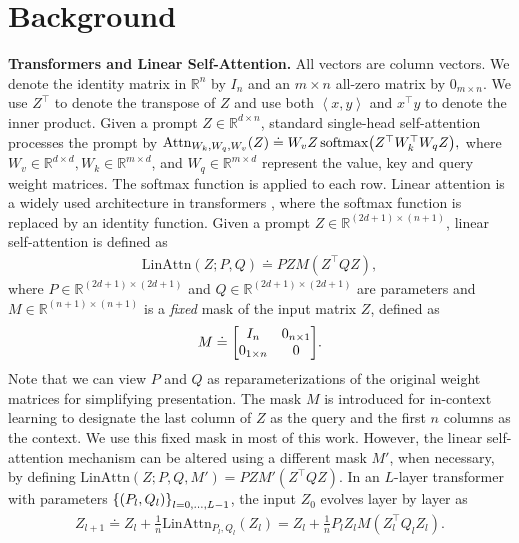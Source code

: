 \documentclass{article}
\newcommand{\R}{\mathbb{R}}
\newcommand{\indot}[2]{{\left<#1, #2\right>}}
\newcommand{\attn}{\text{LinAttn}}
\newcommand{\softmax}[1]{\text{softmax}\qty(#1)}
\begin{document}
\section{Background}
\label{sec bkg}
\textbf{Transformers and Linear Self-Attention.}
All vectors are column vectors.
We denote the identity matrix in $\R^n$ by $I_n$ and an $m \times n$ all-zero matrix by $0_{m\times n}$.
We use $Z^\top$ to denote the transpose of $Z$ and use both $\indot{x}{y}$ and $x^\top y$ to denote the inner product.
Given a prompt $Z \in \R^{d \times n}$, standard single-head self-attention \citep{vaswani2017} processes the prompt by
$
    \text{Attn}_{W_k, W_q, W_v}(Z) \doteq W_v Z\,  \softmax{Z^\top W_k^\top W_q Z},
$
where $W_v \in \R^{d \times d}, W_k \in \R^{m \times d}$, and  $W_q \in \R^{m \times d}$ represent the value, key and query weight matrices.
The softmax function is applied to each row.
Linear attention is a widely used architecture in transformers \citep{mahankali2023one,ahn2023linear, vonoswald2023transformers, von2023uncovering, wu2023many, ahn2024transformers, gatmiry2024can, zhang2024trained,zheng2024mesa, sander2024transformers},
where the softmax function is replaced by an identity function.
Given a prompt $Z\in\R^{(2d+1) \times (n+1)}$,
linear self-attention is defined as
\begin{align}
    \label{eq linear attention}
    \attn(Z; P, Q) \doteq PZM(Z^\top Q Z),
\end{align}
where $P \in \R^{(2d+1) \times (2d+1)}$ and $Q \in \R^{(2d+1) \times (2d+1)}$ are parameters and $M \in \R^{(n+1) \times (n+1)}$ is a \emph{fixed} mask of the input matrix $Z$, defined as
\begin{align}
    \label{eq td0 mask}
    \textstyle M \doteq \mqty[I_{n} & 0_{n \times 1} \\
    0_{1 \times n} & 0].
\end{align}
Note that we can view $P$ and $Q$ as reparameterizations of the original weight matrices for simplifying presentation.
The mask $M$ is introduced for in-context learning \citep{vonoswald2023transformers}
to designate the last column of $Z$ as the query and the first $n$ columns as the context.
We use this fixed mask in most of this work.
However, the linear self-attention mechanism can be altered using a different mask $M'$, when necessary, by defining $\attn(Z; P, Q, M') = PZM'(Z^\top QZ)$.
In an $L$-layer transformer with parameters $\qty{(P_l, Q_l)}_{l=0,\dots, L-1}$, the input $Z_0$ evolves layer by layer as
\begin{align}
    \textstyle Z_{l+1} \doteq Z_l + \frac{1}{n} \attn_{P_l, Q_l}(Z_l) = Z_l + \frac{1}{n} P_l Z_l M(Z_l^\top Q_l Z_l). \label{eq: Z_l update}
\end{align}
\end{document}
